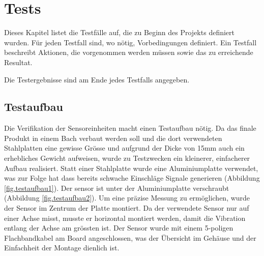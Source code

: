 %
%


\chapter{Tests}\label{chap.tests}

Dieses Kapitel listet die Testfälle auf, die zu Beginn des Projekts definiert wurden. Für jeden Testfall sind, wo nötig, Vorbedingungen definiert. Ein Testfall beschreibt Aktionen, die vorgenommen werden müssen sowie das zu erreichende Resultat.

Die Testergebnisse sind am Ende jedes Testfalls angegeben.

\section{Testaufbau}
Die Verifikation der Sensoreinheiten macht einen Testaufbau nötig. Da das finale Produkt in einem Bach verbaut werden soll und die dort verwendeten Stahlplatten eine gewisse Grösse und aufgrund der Dicke von 15mm auch ein erhebliches Gewicht aufweisen, wurde zu Testzwecken ein kleinerer, einfacherer Aufbau realisiert. Statt einer Stahlplatte wurde eine Aluminiumplatte verwendet, was zur Folge hat dass bereits schwache Einschläge Signale generieren (Abbildung \ref{fig.testaufbau1}). Der \gls{sensor} ist unter der Aluminiumplatte verschraubt (Abbildung \ref{fig.testaufbau2}). Um eine präzise Messung zu ermöglichen, wurde der Sensor im Zentrum der Platte montiert. Da der verwendete Sensor nur auf einer Achse misst, musste er horizontal montiert werden, damit die Vibration entlang der Achse am grössten ist. Der Sensor wurde mit einem 5-poligen Flachbandkabel am Board angeschlossen, was der Übersicht im Gehäuse und der Einfachheit der Montage dienlich ist.  

